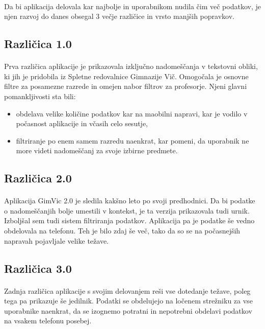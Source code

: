 \paragraph{}Da bi aplikacija delovala kar najbolje in uporabnikom nudila čim več podatkov, je njen razvoj do danes obsegal 3 večje različice in vrsto manjših popravkov.

\subsection{Različica 1.0}
\paragraph{}Prva različica aplikacije je prikazovala izključno nadomeščanja v tekstovni obliki, ki jih je pridobila iz Spletne redovalnice Gimnazije Vič. Omogočala je osnovne filtre za posamezne razrede in omejen nabor filtrov za profesorje. Njeni glavni pomankljivosti sta bili:
\begin{itemize}
  \setlength\itemsep{0em}
  \item obdelava velike količine podatkov kar na maobilni napravi, kar je vodilo v počasnost aplikacije in včasih celo sesutje,
  \item filtriranje po enem samem razredu naenkrat, kar pomeni, da uporabnik ne more videti nadomeščanj za svoje izbirne predmete.
\end{itemize}

\subsection{Različica 2.0}
\paragraph{} Aplikacija GimVic 2.0 je sledila kakšno leto po svoji predhodnici. Da bi podatke o nadomeščanjih bolje umestili v kontekst, je ta verzija prikazovala tudi urnik. Izboljšal sem tudi sistem filtriranja podatkov. Aplikacija pa je podatke še vedno obdelovala na telefonu. Teh je bilo zdaj še več, tako da so se na počasnejših napravah pojavljale velike težave.

\subsection{Različica 3.0}
\paragraph{} Zadnja različica aplikacije s svojim delovanjem reši vse dotedanje težave, poleg tega pa prikazuje še jedilnik. Podatki se obdelujejo na ločenem strežniku za vse uporabnike naenkrat, da se izognemo potratni in nepotrebni obdelavi podatkov na vsakem telefonu posebej.
